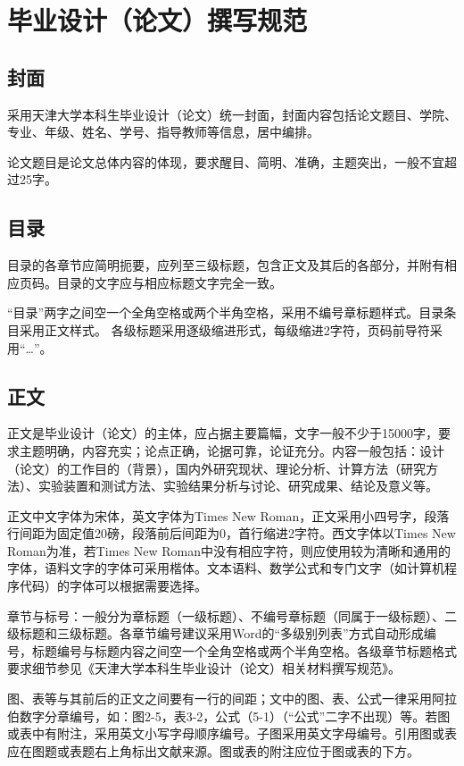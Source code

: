 \section{毕业设计（论文）撰写规范}

\subsection{封面}

采用天津大学本科生毕业设计（论文）统一封面，封面内容包括论文题目、学院、专业、年级、姓名、学号、指导教师等信息，居中编排。

论文题目是论文总体内容的体现，要求醒目、简明、准确，主题突出，一般不宜超过25字。

\subsection{目录}

目录的各章节应简明扼要，应列至三级标题，包含正文及其后的各部分，并附有相应页码。目录的文字应与相应标题文字完全一致。

“目录”两字之间空一个全角空格或两个半角空格，采用不编号章标题样式。目录条目采用正文样式。
各级标题采用逐级缩进形式，每级缩进2字符，页码前导符采用“…”。

\subsection{正文}

正文是毕业设计（论文）的主体，应占据主要篇幅，文字一般不少于15000字，要求主题明确，内容充实；论点正确，论据可靠，论证充分。内容一般包括：设计（论文）的工作目的（背景），国内外研究现状、理论分析、计算方法（研究方法）、实验装置和测试方法、实验结果分析与讨论、研究成果、结论及意义等。

正文中文字体为宋体，英文字体为Times New Roman，正文采用小四号字，段落行间距为固定值20磅，段落前后间距为0，首行缩进2字符。西文字体以Times New Roman为准，若Times New Roman中没有相应字符，则应使用较为清晰和通用的字体，语料文字的字体可采用楷体。文本语料、数学公式和专门文字（如计算机程序代码）的字体可以根据需要选择。

章节与标号：一般分为章标题（一级标题）、不编号章标题（同属于一级标题）、二级标题和三级标题。各章节编号建议采用Word的“多级别列表”方式自动形成编号，标题编号与标题内容之间空一个全角空格或两个半角空格。各级章节标题格式要求细节参见《天津大学本科生毕业设计（论文）相关材料撰写规范》。

图、表等与其前后的正文之间要有一行的间距；文中的图、表、公式一律采用阿拉伯数字分章编号，如：图2-5，表3-2，公式（5-1）（“公式”二字不出现）等。若图或表中有附注，采用英文小写字母顺序编号。子图采用英文字母编号。引用图或表应在图题或表题右上角标出文献来源。图或表的附注应位于图或表的下方。

